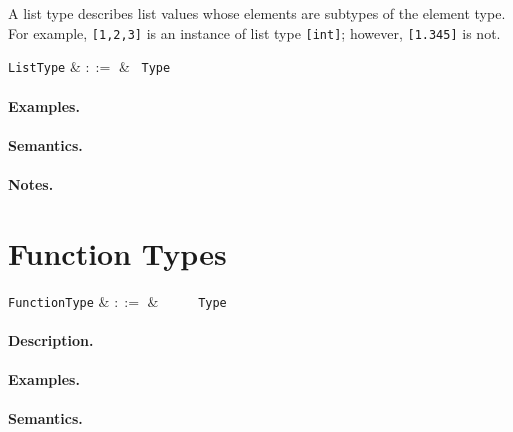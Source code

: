 A list type describes list values whose elements are subtypes of the element type. For example, \lstinline{[1,2,3]} is an instance of list type \lstinline{[int]}; however, \lstinline{[1.345]} is not.

\begin{syntax}
  \verb+ListType+ & $::=$ & \token{[} \ \verb+Type+ \ \token{]}\\
\end{syntax}

\paragraph{Examples.}

\paragraph{Semantics.}

\paragraph{Notes.} 


\section{Function Types}

\begin{syntax}
  \verb+FunctionType+ & $::=$ & \ \token{(}\
  \ \token{)}\ \token{=>}\ \verb+Type+\\
\end{syntax}

\paragraph{Description.}  

\paragraph{Examples.}

\paragraph{Semantics.}

